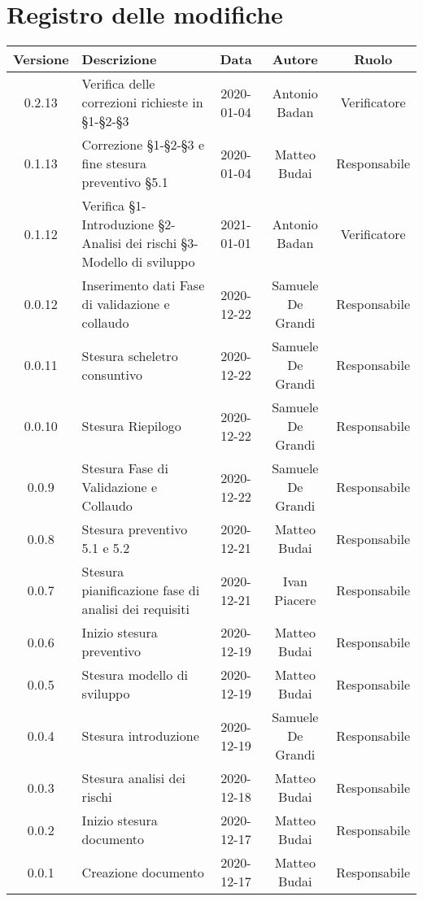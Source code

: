 \section*{Registro delle modifiche}

\begin{center}
	\begin{longtable}{|c|p{5cm}|c|c|c|}
	\hline
	\rowcolor{lighter-grayer}
	\textbf{Versione} & \textbf{Descrizione} & \textbf{Data} & \textbf{Autore} & \textbf{Ruolo} \\
	\hline
	\endfirsthead

	0.2.13 & Verifica delle correzioni richieste in §1-§2-§3 & 2020-01-04 & Antonio Badan & Verificatore \\
	\hline
	0.1.13 & Correzione §1-§2-§3 e fine stesura preventivo §5.1 & 2020-01-04 & Matteo Budai & Responsabile \\
	\hline
	0.1.12 & Verifica §1-Introduzione §2-Analisi dei rischi §3-Modello di sviluppo & 2021-01-01 & Antonio Badan & Verificatore \\
	\hline
	0.0.12 & Inserimento dati Fase di validazione e collaudo & 2020-12-22 & Samuele De Grandi & Responsabile \\
	\hline
	0.0.11 & Stesura scheletro consuntivo & 2020-12-22 & Samuele De Grandi & Responsabile \\
	\hline
	0.0.10 & Stesura Riepilogo & 2020-12-22 & Samuele De Grandi & Responsabile \\
	\hline
	0.0.9 & Stesura Fase di Validazione e Collaudo & 2020-12-22 & Samuele De Grandi & Responsabile \\
	\hline
	0.0.8 & Stesura preventivo 5.1 e 5.2 & 2020-12-21 & Matteo Budai & Responsabile \\
	\hline
	0.0.7 & Stesura pianificazione fase di analisi dei requisiti & 2020-12-21 & Ivan Piacere & Responsabile \\
	\hline
	0.0.6 & Inizio stesura preventivo & 2020-12-19 & Matteo Budai & Responsabile \\
	\hline
	0.0.5 & Stesura modello di sviluppo & 2020-12-19 & Matteo Budai & Responsabile \\
	\hline
	0.0.4 & Stesura introduzione & 2020-12-19 & Samuele De Grandi & Responsabile \\
	\hline
	0.0.3 & Stesura analisi dei rischi & 2020-12-18 & Matteo Budai & Responsabile \\
	\hline
	0.0.2 & Inizio stesura documento & 2020-12-17 & Matteo Budai & Responsabile \\
	\hline
	0.0.1 & Creazione documento & 2020-12-17 & Matteo Budai & Responsabile \\
	\hline

	\end{longtable}
\end{center}